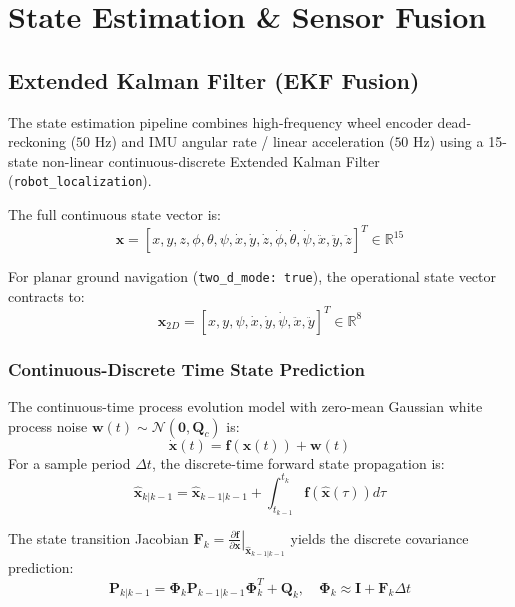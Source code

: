 \documentclass[10pt,a4paper]{article}
\begin{document}
\section{State Estimation \& Sensor Fusion}

\subsection{Extended Kalman Filter (EKF Fusion)}
The state estimation pipeline combines high-frequency wheel encoder dead-reckoning ($50\text{ Hz}$) and IMU angular rate / linear acceleration ($50\text{ Hz}$) using a 15-state non-linear continuous-discrete Extended Kalman Filter (\texttt{robot\_localization}).

The full continuous state vector is:
\begin{equation}
\mathbf{x} = [x, y, z, \phi, \theta, \psi, \dot{x}, \dot{y}, \dot{z}, \dot{\phi}, \dot{\theta}, \dot{\psi}, \ddot{x}, \ddot{y}, \ddot{z}]^T \in \mathbb{R}^{15}
\end{equation}

For planar ground navigation (\texttt{two\_d\_mode: true}), the operational state vector contracts to:
\begin{equation}
\mathbf{x}_{2D} = [x, y, \psi, \dot{x}, \dot{y}, \dot{\psi}, \ddot{x}, \ddot{y}]^T \in \mathbb{R}^8
\end{equation}

\subsubsection{Continuous-Discrete Time State Prediction}
The continuous-time process evolution model with zero-mean Gaussian white process noise $\mathbf{w}(t) \sim \mathcal{N}(\mathbf{0}, \mathbf{Q}_c)$ is:
\begin{equation}
\dot{\mathbf{x}}(t) = \mathbf{f}(\mathbf{x}(t)) + \mathbf{w}(t)
\end{equation}
For a sample period $\Delta t$, the discrete-time forward state propagation is:
\begin{equation}
\hat{\mathbf{x}}_{k|k-1} = \hat{\mathbf{x}}_{k-1|k-1} + \int_{t_{k-1}}^{t_k} \mathbf{f}(\hat{\mathbf{x}}(\tau)) d\tau
\end{equation}

The state transition Jacobian $\mathbf{F}_k = \left. \frac{\partial \mathbf{f}}{\partial \mathbf{x}} \right|_{\hat{\mathbf{x}}_{k-1|k-1}}$ yields the discrete covariance prediction:
\begin{equation}
\mathbf{P}_{k|k-1} = \mathbf{\Phi}_k \mathbf{P}_{k-1|k-1} \mathbf{\Phi}_k^T + \mathbf{Q}_k, \quad \mathbf{\Phi}_k \approx \mathbf{I} + \mathbf{F}_k \Delta t
\end{equation}
\end{document}
